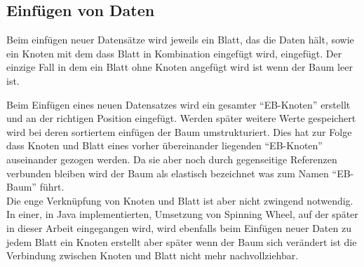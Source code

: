 \documentclass[a4paper,11pt,oneside,%
headsepline,												%
footsepline,												%
bibtotocnumbered									%
]{scrreprt}
\begin{document}
\subsection{Einfügen von Daten}
Beim einfügen neuer Datensätze wird jeweils ein Blatt, das die Daten hält, sowie ein Knoten mit dem dass Blatt in Kombination eingefügt wird, eingefügt. Der einzige Fall in dem ein Blatt ohne Knoten angefügt wird ist wenn der Baum leer ist.

Beim Einfügen eines neuen Datensatzes wird ein gesamter \enquote{EB-Knoten} erstellt und an der richtigen Position eingefügt. Werden später weitere Werte gespeichert wird bei deren sortiertem einfügen der Baum umstrukturiert. Dies hat zur Folge dass Knoten und Blatt eines vorher übereinander liegenden \enquote{EB-Knoten} auseinander gezogen werden. Da sie aber noch durch gegenseitige Referenzen verbunden bleiben wird der Baum als elastisch bezeichnet was zum Namen \enquote{\ac{EB-Baum}} führt.\\
Die enge Verknüpfung von Knoten und Blatt ist aber nicht zwingend notwendig. In einer, in Java implementierten, Umsetzung von Spinning Wheel, auf der später in dieser Arbeit eingegangen wird, wird ebenfalls beim Einfügen neuer Daten zu jedem Blatt ein Knoten erstellt aber später wenn der Baum sich verändert ist die Verbindung zwischen Knoten und Blatt nicht mehr nachvollziehbar.
\newpage
\end{document}
